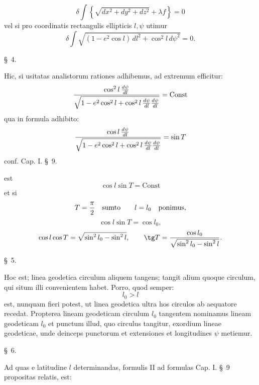\[
 \delta\int\left\{\sqrt{dx^2+dy^2+dz^2}+\lambda f\right\}=0
\]
vel si pro coordinatis rectangulis  ellipticis $l,\psi$ utimur
\[
 \delta\int \sqrt{(1-e^2\cos l)\,dl^2+\cos^2l\,d\psi^2}=0.
\]

\begin{center}\S\ 4.\end{center}
Hic, si usitatas analistorum rationes adhibemus, ad extremum efficitur:
\[
 {\cos^2l\,{d\psi\over dl}\over\sqrt{1-e^2\cos^2l+\cos^2l\,{d\psi\over dl}{d\psi\over dl}}}=\mathrm{Const}
\]
qua in formula adhibito:
\[
 {\cos l\,{d\psi\over dl}\over\sqrt{1-e^2\cos^2l+\cos^2l\,{d\psi\over dl}{d\psi\over dl}}}=\sin T
\]
\hfill conf. Cap. I. \S\ 9.

est
\[
 \cos l\sin T=\mathrm{Const}
\]
et si
\[
 T={\pi\over 2}\quad\hbox{sumto}\qquad l=l_0\quad\hbox{ponimus,}
\]
\[
 \cos l\sin T=\cos l_0,
\]
\[
 \cos l\cos T=\sqrt{\sin^2l_0-\sin^2l},
\qquad
 \tg T={\cos l_0\over\sqrt{\sin^2l_0-\sin^2l}}.
\]

\begin{center}\S\ 5.\end{center}
Hoc est; linea geodetica circulum aliquem tangens; tangit alium quoque circulum, qui situm illi convenientem habet. Porro, quod semper:
\[
 l_0>l
\]
est, nunquam fieri potest, ut linea geodetica ultra hos circulos ab aequatore recedat. Propterea lineam geodeticam circulum $l_0$ tangentem nominamus lineam geodeticam $l_0$ et punctum illud, quo circulus tangitur, exordium lineae geodeticae, unde deinceps punctorum et extensiones  et longitudines $\psi$ metiemur.

\begin{center}\S\ 6.\end{center}
Ad quas e latitudine $l$ determinandas, formulis II ad formulas Cap. I. \S\ 9 propositas relatis, est:
